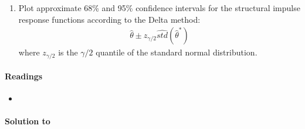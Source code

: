 \begin{enumerate}
\item Plot approximate 68\% and 95\% confidence intervals for the structural impulse response functions according to the Delta method:
\begin{align*}
    \hat{\theta} \pm z_{\gamma/2} \widehat{std}(\hat{\theta}^\ast)
\end{align*}
where \(z_{\gamma/2}\) is the \(\gamma/2\) quantile of the standard normal distribution.
\end{enumerate}

\paragraph{Readings}
\begin{itemize}
	\item \textcite[Ch.~12.1-12.5, 12.9]{Kilian.Lutkepohl_2017_StructuralVectorAutoregressive}
\end{itemize}

\begin{solution}\textbf{Solution to }
\ifDisplaySolutions

\fi
\newpage
\end{solution}